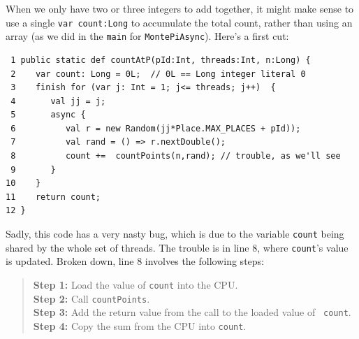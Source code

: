 When we only have two or three integers to add together, it might make sense to
use a single {\tt var count:Long} to accumulate the total count, rather than using
an array (as we did in the {\tt main} for {\tt MontePiAsync}).
Here's a first cut:
\begin{verbatim}
 1 public static def countAtP(pId:Int, threads:Int, n:Long) {
 2    var count: Long = 0L;  // 0L == Long integer literal 0
 3    finish for (var j: Int = 1; j<= threads; j++)  {
 4       val jj = j;
 5       async {
 6          val r = new Random(jj*Place.MAX_PLACES + pId));
 7          val rand = () => r.nextDouble();
 8          count +=  countPoints(n,rand); // trouble, as we'll see
 9       }
10    }
11    return count;
12 }
\end{verbatim}
Sadly, this code has a very nasty bug, which is due to the variable
{\tt count} being shared by the whole set of threads.
The trouble is in line 8, where {\tt count}'s value is updated.  Broken
down, line 8 involves the following steps:
\begin{quote}
  {\bf Step 1: } Load the value of {\tt count} into the CPU.\\
  {\bf Step 2: } Call {\tt countPoints}.\\
  {\bf Step 3: } Add the return value from the call to the loaded value of {\tt
  count}.\\
  {\bf Step 4: } Copy the sum from the CPU into {\tt count}.
\end{quote}

